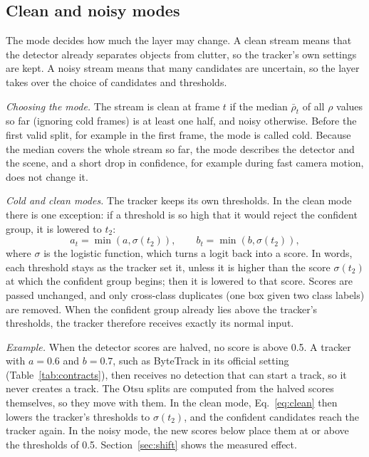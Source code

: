 \documentclass[pdflatex,sn-mathphys-num,iicol]{sn-jnl}
\begin{document}
\subsection{Clean and noisy modes}\label{sec:regimes}
The mode decides how much the layer may change. A clean stream means that
the detector already separates objects from clutter, so the tracker's own
settings are kept. A noisy stream means that many candidates are uncertain,
so the layer takes over the choice of candidates and thresholds.

\emph{Choosing the mode.} The stream is clean at frame $t$ if the median
$\bar\rho_t$ of all $\rho$ values so far (ignoring cold frames) is at least
one half, and noisy otherwise. Before the first valid split, for example in
the first frame, the mode is called cold. Because the median covers the whole
stream so far, the mode describes the detector and the scene, and a short
drop in confidence, for example during fast camera motion, does not change
it.

\emph{Cold and clean modes.} The tracker keeps its own thresholds. In the
clean mode there is one exception: if a threshold is so high that it would
reject the confident group, it is lowered to $t_2$:
\begin{equation}
a_t=\min\!\left(a,\sigma(t_2)\right),\qquad b_t=\min\!\left(b,\sigma(t_2)\right),
\label{eq:clean}
\end{equation}
where $\sigma$ is the logistic function, which turns a logit back into a
score. In words, each threshold stays as the tracker set it, unless it is
higher than the score $\sigma(t_2)$ at which the confident group begins; then
it is lowered to that score. Scores are passed unchanged, and only cross-class duplicates (one box
given two class labels) are removed. When the confident group already lies
above the tracker's thresholds, the tracker therefore receives exactly its
normal input.

\emph{Example.} When the detector scores are halved, no score is above 0.5.
A tracker with $a=0.6$ and $b=0.7$, such as ByteTrack in its official setting
(Table~\ref{tab:contracts}), then receives no detection that can start a
track, so it never creates a track. The Otsu splits are computed from the
halved scores themselves, so they move with them. In the clean mode,
Eq.~\eqref{eq:clean} then lowers the tracker's thresholds to $\sigma(t_2)$,
and the confident candidates reach the tracker again. In the noisy mode, the
new scores below place them at or above the thresholds of 0.5.
Section~\ref{sec:shift} shows the measured effect.
\end{document}
